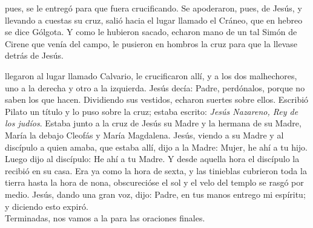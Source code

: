 \documentclass[10pt,twoside]{book}
\begin{document}
\vspace{2mm}
pues, se le entregó para que fuera crucificando. Se apoderaron, pues, de Jesús, y llevando a cuestas su cruz, 
salió hacia el lugar llamado el Cráneo, que en hebreo se dice Gólgota. Y como le hubieron sacado, echaron mano de un tal Simón de Cirene que venía del campo, 
le pusieron en hombros la cruz para que la llevase detrás de Jesús.\\[2mm]

\vspace{5mm}

\vspace{2mm}
llegaron al lugar llamado Calvario, le crucificaron allí, y a los dos malhechores, uno a la derecha y otro a la izquierda. 
Jesús decía: Padre, perdónalos, porque no saben los que hacen. Dividiendo sus vestidos, echaron suertes sobre ellos. Escribió Pilato un título y lo puso sobre la cruz;
estaba escrito: \textit{Jesús Nazareno, Rey de los judíos}. Estaba junto a la cruz de Jesús su Madre y la hermana de su Madre, María la debajo Cleofás y María Magdalena.
Jesús, viendo a su Madre y al discípulo a quien amaba, que estaba allí, dijo a la Madre: Mujer, he ahí a tu hijo. Luego dijo al discípulo: He ahí a tu Madre.
Y desde aquella hora el discípulo la recibió en su casa. Era ya como la hora de sexta, y las tinieblas cubrieron toda la tierra hasta la hora de nona,
obscurecióse el sol y el velo del templo se rasgó por medio. Jesús, dando una gran voz, dijo: Padre, en tus manos entrego mi espíritu; y diciendo esto expiró.\\[2mm]
{} Terminadas, nos vamos a la  para las oraciones finales.\\[5mm]
\end{document}
